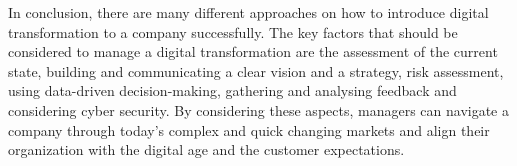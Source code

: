 \documentclass[a4]{scrartcl}
\begin{document}
In conclusion, there are many different approaches on how to introduce digital transformation to a company successfully. 
The key factors that should be considered to manage a digital transformation are the assessment of the current state, building and communicating a clear vision and a strategy, risk assessment, using data-driven decision-making, gathering and analysing feedback and considering cyber security. By considering these aspects, managers can navigate a company through today's complex and quick changing markets and align their organization with the digital age and the customer expectations.










	
	\newpage
	\begin{spacing}{0.9}
		\printbibliography
	\end{spacing}


	
	
	
	
	
	
\end{document}

